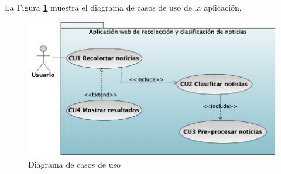 


La Figura \textbf{\ref{fig:DCU}} muestra el diagrama de casos de uso de la aplicación.

\begin{figure}[h]
  \centering
  \includegraphics[scale=.5]{imagenes/Diagramas/CasosDeuso/CasosDeuso}
  \caption{Diagrama de casos de uso}
  \label{fig:DCU}
\end{figure}
